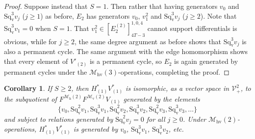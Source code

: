 \documentclass[11pt]{amsart} \renewcommand{\baselinestretch}{1.2}
\theoremstyle{plain}
\newtheorem{cor}[thm]{Corollary}
\theoremstyle{definition}
\newcommand{\calV}{\mathcal{V}}
\newcommand{\calw}{\mathcal{W}}
\newcommand{\calmv}{\mathcal{M}\dver}
\newcommand{\calmh}{\mathcal{M}\dhor}
\newcommand{\calMv}{\mathcal{M}\dver}
\newcommand{\calMh}{\mathcal{M}\dhor}
\newcommand{\calMhv}{\mathcal{M}_\mathrm{hv}}
\newcommand{\vect}[2]{\calV^{#1}_{#2}}
\newcommand{\F}{\mathbb{F}}
\newcommand{\Ftwo}{\F_2}
\newcommand{\E}[5]{[E^{#1}_{#2}#3]^{#4}_{#5}}
\newcommand{\dver}{_\mathrm{v}}
\newcommand{\dhor}{_\mathrm{h}}
\newcommand{\Sqv}{\mathrm{Sq}\dver}
\begin{document}
\begin{Calculations of HWn}
\begin{proof}
Suppose instead that $S=1$. Then rather that having generators $v_0$ and $\Sqv^3v_j$ ($j\geq1$) as before, $E_2$ has generators $v_0$, $v_1^{2}$ and $\Sqv^3v_j$ ($j\geq2$). Note that $\Sqv^{3}v_1=0$ when $S=1$.
That $v_1^2\in\E{(2)}{2}{}{1,0,4}{4T-3}$ cannot support differentials is obvious, while for $j\geq2$, the same degree argument as before shows that $\Sqv^3v_j$ is also a permanent cycle. The same argument with the edge homomorphism shows that every element of $V'_{(2)}$ is a permanent cycle, so $E_2$ is again generated by permanent cycles under the $\calMhv(3)$-operations, completing the proof.
\end{proof}
\begin{cor}
\label{the actual statement of what H1V1 is}
If $S\geq2$, then $H^*_{(1)}V^*_{(1)}$ is isomorphic, as a vector space in $\vect{2}{+}$, to the subquotient of $F^{\calMh(2)}F^{\calMv(2)}V_{(1)}$ generated by the elements
\[\{v_0,\Sqv^2v_{1},\Sqv^3v_{1},\Sqv^2v_{2},\Sqv^3v_{2},\Sqv^2v_{3},\Sqv^3v_{3},\ldots\}\]
and subject to relations generated by $\Sqv^2 v_{j}=0$ for all $j\geq0$. Under $\calMhv(2)$-operations, $H^*_{(1)}V^*_{(1)}$ is generated by $v_0$, $\Sqv^3 v_1$, $\Sqv^3 v_2$, etc.


\end{cor}
\end{Calculations of HWn}
\end{document}
